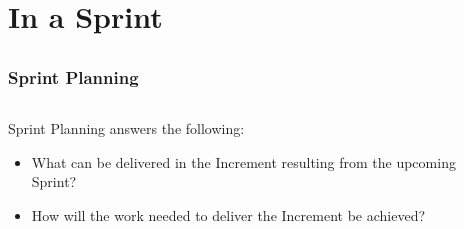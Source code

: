 \section{In a Sprint}
\subsection{}

\begin{frame}
    \frametitle{Sprint Planning}
    \begin{columns}
        \begin{column}{0.5\textwidth}
            Sprint Planning answers the following:
            \vspace{1em}
            \begin{itemize}
                \setlength\itemsep{0.7em}
                \item What can be delivered in the Increment resulting from the upcoming Sprint?
                \item How will the work needed to deliver the Increment be achieved?
            \end{itemize}
        \end{column}
        \begin{column}{0.5\textwidth}
        \end{column}
    \end{columns}
\end{frame}

